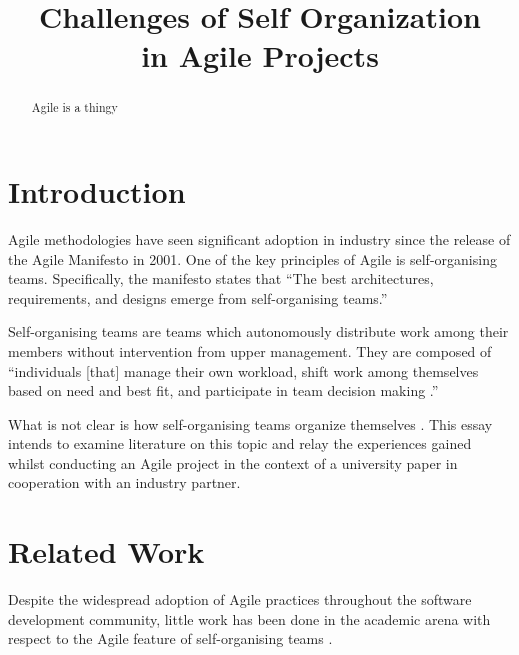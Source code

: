 \documentclass[conference]{IEEEtran}
\begin{document}
\title{Challenges of Self Organization\\in Agile Projects}


\author{
}


\maketitle


\begin{abstract}
Agile is a thingy
\end{abstract}


\section{Introduction}

Agile methodologies have seen significant adoption in industry since the release
of the Agile Manifesto \cite{agileadoption} in 2001. One of the key principles
of Agile is self-organising teams. Specifically, the manifesto states that ``The
best architectures, requirements, and designs emerge from self-organising
teams.'' \cite{fowler2001agile}

Self-organising teams are teams which autonomously distribute work among their
members without intervention from upper management. They are composed of
``individuals [that] manage their own workload, shift work among themselves
based on need and best fit, and participate in team decision
making \cite{highsmith2009agile}.''

What is not clear is how self-organising teams organize themselves
\cite{hoda2010organizing}. This essay intends to examine literature on this
topic and relay the experiences gained whilst conducting an Agile project in the
context of a university paper in cooperation with an industry partner.

\section{Related Work}

Despite the widespread adoption of Agile practices throughout the software
development community, little work has been done in the academic arena with
respect to the Agile feature of self-organising teams \cite{hoda2010balancing}.
\end{document}
